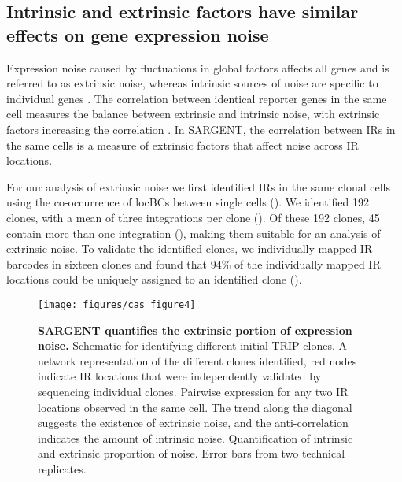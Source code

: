 \subsection{Intrinsic and extrinsic factors have similar effects on gene expression noise}

Expression noise caused by fluctuations in global factors affects all genes and is referred to as extrinsic noise, whereas intrinsic sources of noise are specific to individual genes \cite{deyss_arkinap:OrthogonalControl2015, stewart-ornsteinj_el-samadh:CellularNoise2012, sancheza_goldingi:GeneticDeterminants2013, raserjm_osheaek:ControlStochasticity2004, zopfcj_maheshrin:CellCycleDependence2013, vallaniaflm_mitrard:OriginConsequences2014}. The correlation between identical reporter genes in the same cell measures the balance between extrinsic and intrinsic noise, with extrinsic factors increasing the correlation \cite{elowitzmb_swainps:StochasticGene2002}. In SARGENT, the correlation between IRs in the same cells is a measure of extrinsic factors that affect noise across IR locations. 

For our analysis of extrinsic noise we first identified IRs in the same clonal cells using the co-occurrence of locBCs between single cells (). We identified 192 clones, with a mean of three integrations per clone (). Of these 192 clones, 45 contain more than one integration (), making them suitable for an analysis of extrinsic noise. To validate the identified clones, we individually mapped IR barcodes in sixteen clones and found that 94\% of the individually mapped IR locations could be uniquely assigned to an identified clone (). 

\begin{figure}[tbp]  
    \centering
    \texttt{[image: figures/cas\_figure4]}
    \caption[SARGENT quantifies the extrinsic portion of expression noise.]{%
        \textbf{SARGENT quantifies the extrinsic portion of expression noise.}
        Schematic for identifying different initial TRIP clones.
        A network representation of the different clones identified, red nodes indicate IR locations that were independently validated by sequencing individual clones.
        Pairwise expression for any two IR locations observed in the same cell. The trend along the diagonal suggests the existence of extrinsic noise, and the anti-correlation indicates the amount of intrinsic noise.
        Quantification of intrinsic and extrinsic proportion of noise. Error bars from two technical replicates. 
    }
    \label{fig:cas_figure4}
\end{figure}

